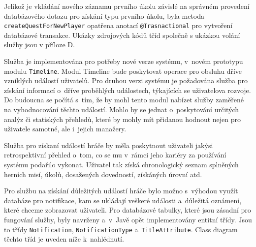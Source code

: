 \documentclass[twoside, 12pt]{article}
\begin{document}
{Jelikož je vkládání nového záznamu prvního úkolu závislé na správném provedení databázového dotazu pro získání typu prvního úkolu,
byla metoda \texttt{createQuestForNewPlayer} opatřena anotací \texttt{@Trasnactional} pro vytvoření databázové transakce.
Ukázky zdrojových kódů tříd společně s ukázkou volání služby jsou v příloze D.

\clearpage


Služba je implementována pro potřeby nové verze systému, v~novém prototypu modulu \texttt{Timeline}.
Modul Timeline bude poskytovat operace pro obsluhu dříve vzniklých událostí uživatelů.
Pro druhou verzi systému je požadována služba pro získání informací o~dříve
proběhlých událostech, týkajících se uživatelova rozvoje.
Do budoucna se počítá s~tím, že by mohl tento modul nabízet služby zaměřené na vyhodnocování těchto událostí.
Mohlo by se jednat o~poskytování určitých analýz či statiských přehledů,
které by mohly mít přidanou hodnout nejen pro uživatele samotné, ale i~jejich manažery.

Služba pro získaní událostí hráče by měla poskytnout
uživateli jakýsi retrospektivní přehled o~tom,
co se mu v~rámci jeho kariéry za používání systému podařilo vykonat.
Uživatel tak získá chronologický seznam splněných herních misí, úkolů,
dosažených dovedností, získáných úrovní atd.


Pro službu na získání důležitých událostí hráče
bylo možno s~výhodou využít databáze pro notifikace,
kam se ukládají veškeré události a~důležitá oznámení, které chceme zobrazovat uživateli.
Pro databázové tabulky, které jsou zásadní pro fungování služby, byly navrženy a~v~Javě opět implementovány entitní třídy.
Jsou to třídy \texttt{Notification}, \texttt{NotificationType} a~\texttt{TitleAttribute}.
Class diagram těchto tříd je uveden níže k~nahlédnutí.

\obrazek
{}

}
\end{document}
